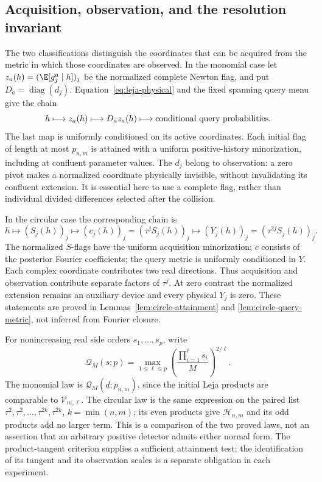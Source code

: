 \subsection{Acquisition, observation, and the resolution invariant}
\label{sec:acquisition-observation-comparison}
The two classifications distinguish the coordinates that can be acquired
from the metric in which those coordinates are observed. In the monomial
case let $z_a(h)=(\E[g_j^a\mid h])_j$ be the normalized complete Newton
flag, and put $D_a=\operatorname{diag}(d_j)$. Equation~\eqref{eq:leja-physical}
and the fixed spanning query menu give the chain
\[
 h\longmapsto z_a(h)\longmapsto D_a z_a(h)
       \longmapsto\hbox{conditional query probabilities}.
\]
The last map is uniformly conditioned on its active coordinates. Each
initial flag of length at most $p_{n,m}$ is attained with a uniform
positive-history minorization, including at confluent parameter values.
The $d_j$ belong to observation: a zero pivot makes a normalized
coordinate physically invisible, without invalidating its confluent
extension. It is essential here to use a complete flag, rather than
individual divided differences selected after the collision.

In the circular case the corresponding chain is
\[
 h\longmapsto(S_j(h))_j
   \longmapsto(c_j(h))_j=(\tau^jS_j(h))_j
   \longmapsto(Y_j(h))_j=(\tau^{2j}S_j(h))_j.
\]
The normalized $S$-flags have the uniform acquisition minorization;
$c$ consists of the posterior Fourier coefficients; the query metric is
uniformly conditioned in $Y$. Each complex coordinate contributes two
real directions. Thus acquisition and observation contribute separate
factors of $\tau^j$. At zero contrast the normalized extension remains
an auxiliary device and every physical $Y_j$ is zero. These statements
are proved in Lemmas~\ref{lem:circle-attainment} and
\ref{lem:circle-query-metric}, not inferred from Fourier closure.

For nonincreasing real side orders $s_1,\ldots,s_p$, write
\[
 \mathcal Q_M(s;p)=\max_{1\le\ell\le p}
       \left(\frac{\prod_{i=1}^{\ell}s_i}{M}\right)^{2/\ell}.
\]
The monomial law is $\mathcal Q_M(d;p_{n,m})$, since the initial
Leja products are comparable to $\mathcal V_{m,\ell}$. The circular
law is the same expression on the paired list
$\tau^2,\tau^2,\ldots,\tau^{2k},\tau^{2k}$, $k=\min(n,m)$;
its even products give $\mathcal H_{n,m}$ and its odd products add
no larger term. This is a comparison of the two proved laws, not an
assertion that an arbitrary positive detector admits either normal form.
The product-tangent criterion supplies a sufficient attainment test;
the identification of its tangent and its observation scales is a
separate obligation in each experiment.

